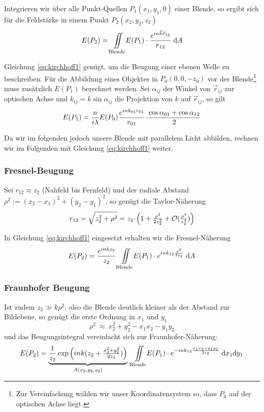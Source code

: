 Integrieren wir über alle Punkt-Quellen $P_1 (x_1, y_1, 0)$ einer Blende, so ergibt sich für die Feldstärke in einem Punkt $P_2 (x_2, y_2, z_2)$
\begin{equation}
E(P_2) = \iint\limits_\text{Blende}\!\! E(P_1) \cdot \frac{e^{i n \vec k \vec r_{12}}}{r_{12}} \;\mathrm{d} A		\label{eq:kirchhoff1}
\end{equation}

Gleichung \eqref{eq:kirchhoff1} genügt, um die Beugung einer ebenen Welle zu beschreiben. Für die Abbildung eines Objektes in $P_0 (0, 0, -z_0)$ vor der Blende\footnote{Zur Vereinfachung wählen wir unser Koordinatensystem so, dass $P_0$ auf der optischen Achse liegt.} muss zusätzlich $E(P_1)$ berechnet werden. Sei $\alpha_{ij}$ der Winkel von $\vec r_{ij}$ zur optischen Achse und $k_{ij} = k \sin \alpha_{ij}$ die Projektion von $k$ auf $\vec r_{ij}$, so gilt \cite[S.\,30]{lit:HL-Laser}
\begin{equation}
E(P_1) = \frac{n}{i\lambda} E(P_0) \frac{e^{i n k_{01} r_{01}}}{r_{01}} \!\cdot\! \frac{\cos \alpha_{01} + \cos \alpha_{12}}{2}
\end{equation}

Da wir im folgenden jedoch unsere Blende mit parallelem Licht abbilden, rechnen wir im Folgenden mit Gleichung \eqref{eq:kirchhoff1} weiter.

\subsubsection{Fresnel-Beugung}
Sei $r_{12} \approx z_2$ (Nahfeld bis Fernfeld) und der radiale Abstand $\rho^2 := (x_2 - x_1)^2 + (y_2 - y_1)^2$, so genügt die Taylor-Näherung 
\begin{equation}
r_{12} = \sqrt{z_2^2 + \rho^2} = z_2 \!\cdot\! \left( 1 + \tfrac{\rho^2}{2 z_2^2} + \mathcal{O}(\tfrac{\rho^4}{z_2^4}) \right)
\end{equation}

In Gleichung \eqref{eq:kirchhoff1} eingesetzt erhalten wir die Fresnel-Näherung
\begin{equation}
E(P_2) = \frac{e^{i n k z_2 }}{z_2} \iint\limits_\text{Blende}\!\! E(P_1) \cdot e^{i n k_{12} \frac{\rho^2}{2 z_2} } \;\mathrm{d} A
\label{eq:Fresnel_B}
\end{equation}

\subsubsection{Fraunhofer Beugung}
Ist zudem $z_2 \gg k \rho^2$, also die Blende deutlich kleiner als der Abstand zur Bildebene, so genügt die erste Ordnung in $x_1$ und $y_1$
\begin{equation}
\rho^2 ~\approx~ x_2^2 + y_2^2 - x_1 x_2 - y_1 y_2
\end{equation}
 und das Beugungsintegral vereinfacht sich zur Fraunhofer-Näherung:
\begin{equation}
E(P_2) =  \underbrace{
\frac{1}{z_2} \exp \left(i n k (z_2 +  \tfrac{x_2^2 + y_2^2}{2 z_2}) \right)
}_{A(x_2, y_2, z_2)} ~
\iint\limits_\text{Blende}\!\! E(P_1) \cdot e^{-i n k_{12} \frac{x_1 x_2 + y_1 y_2}{2 z_2} } \;\mathrm{d} x_1 \mathrm{d} y_1
\end{equation}

